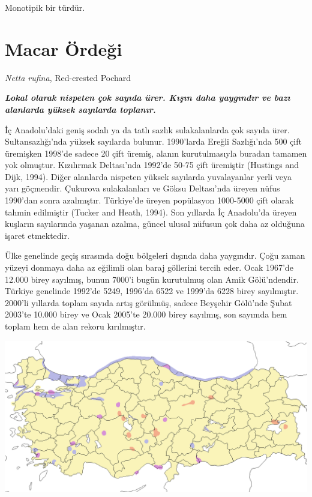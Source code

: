 \documentclass[
  a4paper,
  DIV=11,
  numbers=noendperiod]{scrartcl}
\begin{document}
Monotipik bir türdür.

\section{Macar Ördeği}\label{macar-uxf6rdeux11fi}

\emph{Netta rufina}, Red-crested Pochard

\textbf{\emph{Lokal olarak nispeten çok sayıda ürer. Kışın daha
yaygındır ve bazı alanlarda yüksek sayılarda toplanır.}}

İç Anadolu'daki geniş sodalı ya da tatlı sazlık sulakalanlarda çok
sayıda ürer. Sultansazlığı'nda yüksek sayılarda bulunur. 1990'larda
Ereğli Sazlığı'nda 500 çift üremişken 1998'de sadece 20 çift üremiş,
alanın kurutulmasıyla buradan tamamen yok olmuştur. Kızılırmak
Deltası'nda 1992'de 50-75 çift üremiştir (Hustings and Dijk, 1994).
Diğer alanlarda nispeten yüksek sayılarda yuvalayanlar yerli veya yarı
göçmendir. Çukurova sulakalanları ve Göksu Deltası'nda üreyen nüfus
1990'dan sonra azalmıştır. Türkiye'de üreyen popülasyon 1000-5000 çift
olarak tahmin edilmiştir (Tucker and Heath, 1994). Son yıllarda İç
Anadolu'da üreyen kuşların sayılarında yaşanan azalma, güncel ulusal
nüfusun çok daha az olduğuna işaret etmektedir.

Ülke genelinde geçiş sırasında doğu bölgeleri dışında daha yaygındır.
Çoğu zaman yüzeyi donmaya daha az eğilimli olan baraj göllerini tercih
eder. Ocak 1967'de 12.000 birey sayılmış, bunun 7000'i bugün kurutulmuş
olan Amik Gölü'ndendir. Türkiye genelinde 1992'de 5249, 1996'da 6522 ve
1999'da 6228 birey sayılmıştır. 2000'li yıllarda toplam sayıda artış
görülmüş, sadece Beyşehir Gölü'nde Şubat 2003'te 10.000 birey ve Ocak
2005'te 20.000 birey sayılmış, son sayımda hem toplam hem de alan rekoru
kırılmıştır.

\includegraphics{images/harita_Netta rufina.png}
\end{document}
